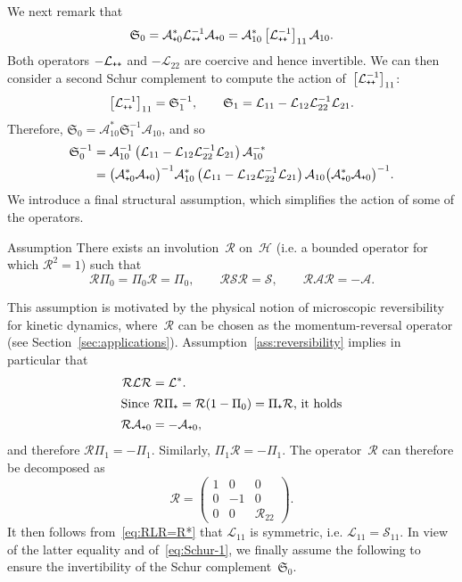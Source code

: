 \documentclass[10pt]{amsart}
\theoremstyle{definition}\newtheorem{defi}[theo]{Definition}\newtheorem{rema}[theo]{Remark}\newtheorem{exam}[theo]{Example}\newtheorem{exem}[theo]{Example}\newtheorem{nota}[theo]{Notation}
\newcommand{\cL}{\mathcal{L}}
\newcommand{\cLs}{\mathcal{S}}
\newcommand{\cLa}{\mathcal{A}}
\newcommand{\cR}{\mathcal{R}}
\newcommand{\cH}{\mathcal{H}}
\newcommand{\Schur}{\mathfrak{S}_0}
\newcommand{\Schurb}{\mathfrak{S}_1}
\newcommand{\subplus}{\textnormal{\texttt{+}}}
\begin{document}
We next remark that
\begin{equation}\label{eq:Schur_L++11}
\Schur = \cLa_{\subplus0}^{*} \cL_{\subplus\subplus}^{-1} \cLa_{\subplus0} = \cLa_{10}^{*} \left[\cL_{\subplus\subplus}^{-1}\right]_{11} \cLa_{10}.
\end{equation}
Both operators $-\cL_{\subplus\subplus}$ and $-\cL_{22}$ are coercive and hence invertible. We can then consider a second Schur complement to compute the action of~$\left[\cL_{\subplus\subplus}^{-1}\right]_{11}$:
\[
\left[\cL_{\subplus\subplus}^{-1}\right]_{11} = \Schurb^{-1}, \qquad \Schurb = \cL_{11} - \cL_{12} \cL_{22}^{-1} \cL_{21}.
\]
Therefore, $\Schur = \cLa_{10}^{*} \Schurb^{-1}\cLa_{10}$, and so
\begin{equation}
\begin{aligned}\label{eq:Schur-1}
\Schur^{-1} & = \cLa_{10}^{-1}\left(\cL_{11} - \cL_{12} \cL_{22}^{-1} \cL_{21} \right)\cLa_{10}^{-*} \\
& = \big(\cLa_{\subplus0}^*\cLa_{\subplus0}\big)^{-1} \cLa_{10}^* \left(\cL_{11} - \cL_{12} \cL_{22}^{-1} \cL_{21} \right) \cLa_{10} \big(\cLa_{\subplus0}^*\cLa_{\subplus0}\big)^{-1}.
\end{aligned}
\end{equation}
We introduce a final structural assumption, which simplifies the action of some of the operators.

\begin{enonce}{Assumption}\label{ass:reversibility}
There exists an involution~$\cR$ on~$\cH$ (i.e. a bounded operator for which $\cR^2 = 1$) such that
\[
\cR \Pi_{0} = \Pi_{0} \cR = \Pi_{0}, \qquad \cR \cLs\cR = \cLs, \qquad \cR \cLa \cR = - \cLa.
\]
\end{enonce}

This assumption is motivated by the physical notion of microscopic reversibi\-lity for kinetic dynamics, where~$\cR$ can be chosen as the momentum-reversal operator (see Section~\ref{sec:applications}). Assumption~\ref{ass:reversibility} implies in particular that
\begin{align}
\cR \cL \cR &= \cL^*.\label{eq:RLR=R*}
\\
\intertext{Since $\cR\Pi_\subplus = \cR(1-\Pi_0) = \Pi_\subplus \cR$, it holds}
\cR \cLa_{\subplus0} &= -\cLa_{\subplus0},\label{eq:R_A+0}
\end{align}
and therefore $\cR \Pi_{1} = -\Pi_{1}$. Similarly, $\Pi_{1} \cR = -\Pi_{1}$. The operator~$\cR$ can therefore be decomposed as
\[
\cR =
\begin{pmatrix}
1&0&0\\
0&-1&0\\
0&0&\cR_{22}
\end{pmatrix}.
\]
It then follows from~\eqref{eq:RLR=R*} that $\cL_{11}$ is symmetric,
i.e. $\cL_{11} = \cLs_{11}$. In view of the latter equality and of~\eqref{eq:Schur-1}, we finally assume the following to ensure the invertibility of the Schur complement~$\Schur$.
\end{document}
